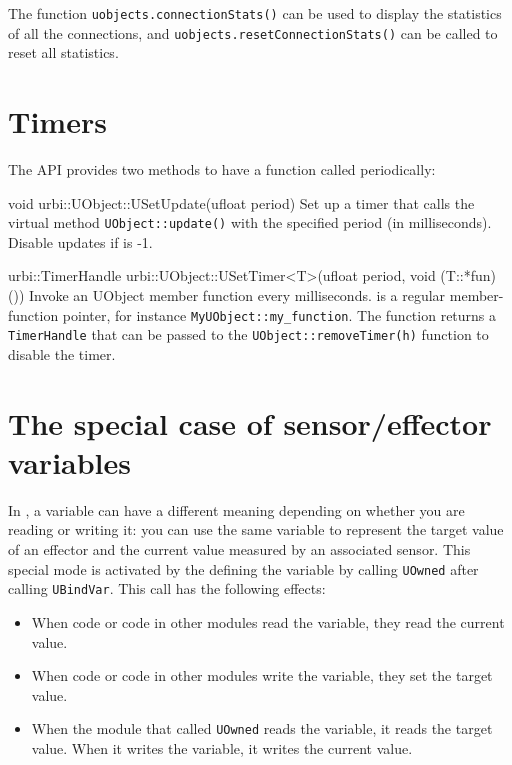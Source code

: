 The function \lstinline|uobjects.connectionStats()| can be used to display
the statistics of all the connections, and
\lstinline|uobjects.resetConnectionStats()| can be called to reset all
statistics.

\section{Timers}
\label{sec:uob:timers}

The API provides two methods to have a function called periodically:
\begin{cxxapi}
\item[void urbi::UObject::USetUpdate(ufloat period)] Set up a timer that
  calls the virtual method \lstinline{UObject::update()} with the specified
  period (in milliseconds).  Disable updates if  is -1.

\item[urbi::TimerHandle urbi::UObject::USetTimer<T>(ufloat period, void (T::*fun)())]
  Invoke an UObject member function  every 
  milliseconds.   is a regular member-function pointer, for
  instance \lstinline|MyUObject::my_function|.
  The function returns a \lstinline|TimerHandle| that can be passed to the
  \lstinline|UObject::removeTimer(h)| function to disable the timer.
\end{cxxapi}

\section{The special case of sensor/effector variables}

In \urbi, a variable can have a different meaning depending on whether you
are reading or writing it: you can use the same variable to represent the
target value of an effector and the current value measured by an associated
sensor. This special mode is activated by the \UObject defining the variable
by calling \lstinline{UOwned} after calling \lstinline{UBindVar}. This call
has the following effects:
\begin{itemize}
\item When \urbi code or code in other modules read the variable, they read
  the current value.
\item When \urbi code or code in other modules write the variable, they set
  the target value.
\item When the module that called \lstinline|UOwned| reads the variable, it
  reads the target value. When it writes the variable, it writes the current
  value.
\end{itemize}

